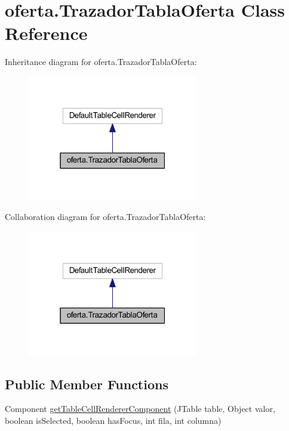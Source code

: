 \hypertarget{classoferta_1_1_trazador_tabla_oferta}{}\section{oferta.\+Trazador\+Tabla\+Oferta Class Reference}
\label{classoferta_1_1_trazador_tabla_oferta}


Inheritance diagram for oferta.\+Trazador\+Tabla\+Oferta\+:
\nopagebreak
\begin{figure}[H]
\begin{center}
\leavevmode
\includegraphics[width=211pt]{classoferta_1_1_trazador_tabla_oferta__inherit__graph}
\end{center}
\end{figure}


Collaboration diagram for oferta.\+Trazador\+Tabla\+Oferta\+:
\nopagebreak
\begin{figure}[H]
\begin{center}
\leavevmode
\includegraphics[width=211pt]{classoferta_1_1_trazador_tabla_oferta__coll__graph}
\end{center}
\end{figure}
\subsection*{Public Member Functions}
\begin{DoxyCompactItemize}
\item 
Component \mbox{\hyperlink{classoferta_1_1_trazador_tabla_oferta_af84656dfae0fe918cf12d01a145a4e10}{get\+Table\+Cell\+Renderer\+Component}} (J\+Table table, Object valor, boolean is\+Selected, boolean has\+Focus, int fila, int columna)
\end{DoxyCompactItemize}


